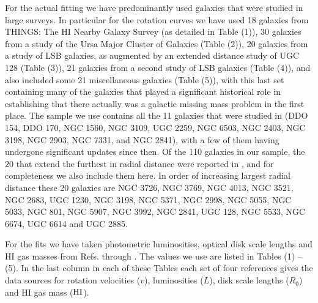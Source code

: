 \documentclass[preprint,aps]{revtex4}
\begin{document}
For the actual fitting we have predominantly used galaxies that were studied in large surveys. In particular for the rotation curves we have used 
18 galaxies from THINGS: The HI Nearby Galaxy Survey (as detailed in Table (1)), 
30 galaxies from a study of the Ursa Major  Cluster of Galaxies (Table (2)), 
20 galaxies from a study of LSB galaxies, as augmented by an extended distance study of UGC 128  (Table (3)), 21 galaxies from a second study of LSB galaxies (Table (4)), 
and also included some 21 miscellaneous galaxies (Table (5)), with this last set containing many of the galaxies that played a significant historical role in establishing that there actually was a galactic missing mass problem in the first place.  The sample we use contains all the 11 galaxies that were studied in \cite{Mannheim1997} (DDO 154, DDO 170, NGC 1560, NGC 3109, UGC 2259, NGC 6503, NGC 2403, NGC 3198, NGC 2903, NGC 7331, and NGC 2841), with a few of them having undergone significant updates since then. Of the 110 galaxies in our sample, the 20 that extend the furthest in radial distance were reported in \cite{Mannheim2010b}, and for completeness we also include them here. In order of increasing largest radial distance these 20 galaxies are NGC 3726, NGC 3769, NGC 4013, NGC 3521, NGC 2683, UGC 1230, NGC 3198, NGC 5371, NGC 2998, NGC 5055, NGC 5033, NGC 801, NGC 5907, NGC 3992, NGC 2841, UGC 128,  NGC 5533, NGC 6674, UGC 6614 and UGC 2885.

For the fits we have taken photometric luminosities, optical disk scale lengths and HI gas masses  from Refs. \cite{deBlok2008} through \cite{Roelfsema1985}. The values we use are listed in  Tables (1) -- (5). In the last column in each of these Tables each set of four references gives the data sources for rotation velocities ($v$), luminosities ($L$), disk scale lengths ($R_0$) and HI gas mass (${\rm HI}$).
\end{document}
